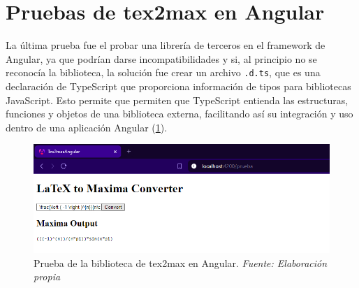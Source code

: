 \section{Pruebas de tex2max en Angular}
La última prueba fue el probar una librería de terceros en el framework de Angular, ya que podrían darse incompatibilidades y si, al principio no se reconocía la biblioteca, la solución fue crear un archivo \texttt{.d.ts}, que es una declaración de TypeScript que proporciona información de tipos para bibliotecas JavaScript. Esto permite que permiten que TypeScript entienda las estructuras, funciones y objetos de una biblioteca externa, facilitando así su integración y uso dentro de una aplicación Angular (\ref{fig:tex2max_angular}).
\begin{figure}[H]
	\centering
	\includegraphics[width=1\textwidth]{img/chapter06/tex2max_angular.png}
	\caption[Prueba de la biblioteca de tex2max en Angular.]{Prueba de la biblioteca de tex2max en Angular. \textit{Fuente: Elaboración propia}}
	\label{fig:tex2max_angular}
\end{figure}